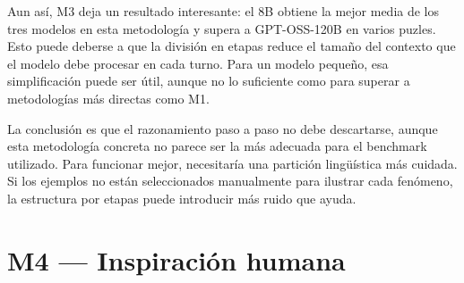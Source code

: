 Aun así, M3 deja un resultado interesante: el 8B obtiene la mejor media de los tres modelos en esta metodología y supera a GPT-OSS-120B en varios puzles. Esto puede deberse a que la división en etapas reduce el tamaño del contexto que el modelo debe procesar en cada turno. Para un modelo pequeño, esa simplificación puede ser útil, aunque no lo suficiente como para superar a metodologías más directas como M1.

La conclusión es que el razonamiento paso a paso no debe descartarse, aunque esta metodología concreta no parece ser la más adecuada para el benchmark utilizado. Para funcionar mejor, necesitaría una partición lingüística más cuidada. Si los ejemplos no están seleccionados manualmente para ilustrar cada fenómeno, la estructura por etapas puede introducir más ruido que ayuda.

\section{M4 — Inspiración humana}
\label{sec:resultados_m4}

